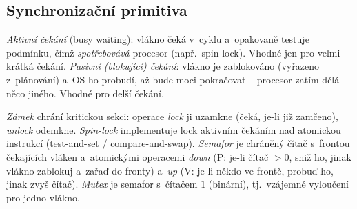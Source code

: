 \subsection{Synchronizační primitiva}

\begin{definice}
\emph{Aktivní čekání} (busy waiting): vlákno čeká v~cyklu a~opakovaně testuje podmínku, čímž \emph{spotřebovává} procesor (např.\ spin-lock). Vhodné jen pro velmi krátká čekání. \emph{Pasivní (blokující) čekání}: vlákno je zablokováno (vyřazeno z~plánování) a~OS ho probudí, až bude moci pokračovat -- procesor zatím dělá něco jiného. Vhodné pro delší čekání.
\end{definice}

\begin{definice}
\emph{Zámek} chrání kritickou sekci: operace \emph{lock} ji uzamkne (čeká, je-li již zamčeno), \emph{unlock} odemkne. \emph{Spin-lock} implementuje lock aktivním čekáním nad atomickou instrukcí (test-and-set / compare-and-swap). \emph{Semafor} je chráněný čítač s~frontou čekajících vláken a~atomickými operacemi \emph{down} (P: je-li čítač $>0$, sniž ho, jinak vlákno zablokuj a~zařaď do fronty) a~\emph{up} (V: je-li někdo ve frontě, probuď ho, jinak zvyš čítač). \emph{Mutex} je semafor s~čítačem $1$ (binární), tj.\ vzájemné vyloučení pro jedno vlákno.
\end{definice}

\begin{center}
%
\end{center}

